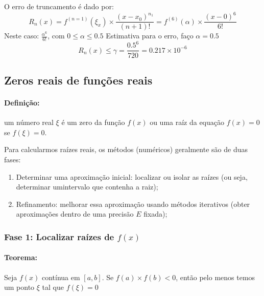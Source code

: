 \documentclass[a4paper,oneside,article,table]{article}
\begin{document}
        O erro de truncamento é dado por:
        \[R_n(x) = f^{(n=1)}(\xi_x) \times \frac{(x - x_0)^{n_1}}{(n+1)!} = f^{(6)}(\alpha) \times \frac{(x - 0)^6}{6!}\]
        Neste caso: $\frac{\alpha^6}{6!}$, com $0 \leq \alpha \leq 0.5$
        Estimativa para o erro, faço $\alpha = 0.5$
        \[R_n(x) \leq \gamma = \frac{0.5^6}{720} = 0.217 \times 10^{-6}\]

        \subsection{Zeros reais de funções reais}
        \paragraph{Definição:} um número real $\xi$ é um zero da função $f(x)$ ou uma raíz da equação $f(x)=0$ se $f(\xi)=0$.


        Para calcularmos raízes reais, os métodos (numéricos) geralmente são de duas fases:

        \begin{enumerate}
            \item Determinar uma aproximação inicial: localizar ou isolar as raízes (ou seja, determinar umintervalo que contenha a raiz);
            \item Refinamento: melhorar essa aproximação usando métodos iterativos (obter aproximações dentro de uma precisão $E$ fixada);
        \end{enumerate}

        \subsubsection{Fase 1: Localizar raízes de $f(x)$}
        \paragraph{Teorema:} Seja $f(x)$ contínua em $[a,b]$. Se $f(a) \times f(b) < 0$, então pelo menos temos um ponto $\xi$ tal que $f(\xi) = 0$
\end{document}
